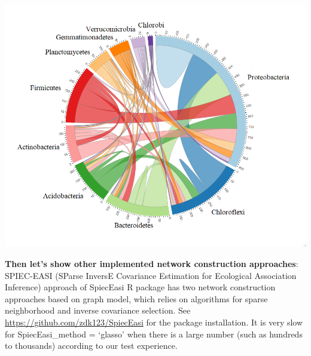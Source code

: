 \documentclass[
]{book}
\newenvironment{Shaded}{\begin{snugshade}}{\end{snugshade}}
\newcommand{\AttributeTok}[1]{\textcolor[rgb]{0.77,0.63,0.00}{#1}}
\newcommand{\CommentTok}[1]{\textcolor[rgb]{0.56,0.35,0.01}{\textit{#1}}}
\newcommand{\ConstantTok}[1]{\textcolor[rgb]{0.00,0.00,0.00}{#1}}
\newcommand{\DecValTok}[1]{\textcolor[rgb]{0.00,0.00,0.81}{#1}}
\newcommand{\FunctionTok}[1]{\textcolor[rgb]{0.00,0.00,0.00}{#1}}
\newcommand{\NormalTok}[1]{#1}
\newcommand{\SpecialCharTok}[1]{\textcolor[rgb]{0.00,0.00,0.00}{#1}}
\newcommand{\StringTok}[1]{\textcolor[rgb]{0.31,0.60,0.02}{#1}}
\begin{document}
\begin{Shaded}
\end{Shaded}

\begin{center}\includegraphics[width=700px]{Images/plot_sum_links} \end{center}

\textbf{Then let's show other implemented network construction approaches}:\\
SPIEC-EASI (SParse InversE Covariance Estimation for Ecological Association Inference) approach of SpiecEasi R package \citep{Kurtz_Sparse_2015}
has two network construction approaches based on graph model, which relies on algorithms for sparse neighborhood and inverse covariance selection.
See \url{https://github.com/zdk123/SpiecEasi} for the package installation.
It is very slow for SpiecEasi\_method = `glasso' when there is a large number (such as hundreds to thousands) according to our test experience.
\end{document}
